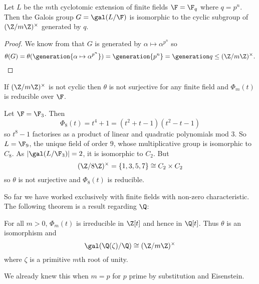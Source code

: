 \documentclass[a4paper]{article}
\begin{document}
\begin{theorem}
  Let \(L\) be the \(m\)th cyclotomic extension of finite fields \(\F = \F_q\) where \(q = p^n\). Then the Galois group \(G = \gal(L/\F)\) is isomorphic to the cyclic subgroup of \((\Z/m\Z)^\times\) generated by \(q\).
\end{theorem}

\begin{proof}
  We know from  that \(G\) is generated by \(\alpha \mapsto \alpha^{p^n}\) so
  \[
    \theta(G) = \theta(\generation{\alpha \mapsto \alpha^{p^n}}) =  \generation{p^n} = \generation q \leq (\Z/m\Z)^\times.
  \]
\end{proof}

\begin{remark}
  If \((\Z/m\Z)^\times\) is not cyclic then \(\theta\) is not surjective for any finite field and \(\Phi_m(t)\) is reducible over \(\F\).
\end{remark}

\begin{eg}
  Let \(\F = \F_3\). Then
  \[
    \Phi_8(t) =  t^4 + 1 = (t^2 + t - 1)(t^2 - t - 1)
  \]
  so \(t^8 - 1\) factorises as a product of linear and quadratic polynomials mod \(3\). So \(L = \F_9\), the unique field of order \(9\), whose multiplicative group is isomorphic to \(C_8\). As \(|\gal(L/\F_3)| = 2\), it is isomorphic to \(C_2\). But
  \[
    (\Z/8\Z)^\times = \{1, 3, 5, 7\} \cong C_2 \times C_2
  \]
  so \(\theta\) is not surjective and \(\Phi_8(t)\) is reducible.
\end{eg}

So far we have worked exclusively with finite fields with non-zero characteristic. The following theorem is a result regarding \(\Q\):

\begin{theorem}
  \label{thm:cyclotomic extension of Q}
  For all \(m > 0\), \(\Phi_m(t)\) is irreducible in \(\Z[t]\) and hence in \(\Q[t]\). Thus \(\theta\) is an isomorphism and
  \[
    \gal(\Q(\zeta)/\Q) \cong (\Z/m\Z)^\times
  \]
  where \(\zeta\) is a primitive \(m\)th root of unity.
\end{theorem}

\begin{remark}
  We already knew this when \(m = p\) for \(p\) prime by substitution and Eisenstein.
\end{remark}
\end{document}
